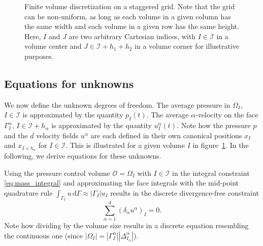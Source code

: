 \documentclass[preprint]{elsarticle}
\begin{document}
\begin{figure}
    \caption{
        Finite volume discretization on a staggered grid. Note that the grid can
        be non-uniform, as long as each volume in a given column has the same
        width and each volume in a given row has the same height. Here, $I$ and
        $J$ are two arbitrary Cartesian indices, with $I \in \mathcal{I}$ in a
        volume center and $J \in \mathcal{I} + h_1 + h_2$ in a volume corner for
        illustrative purposes.
    }
    \label{fig:finitevolumes}
\end{figure}

\subsection{Equations for unknowns}

We now define the unknown degrees of freedom. The average pressure in
$\Omega_I$, $I \in \mathcal{I}$ is approximated by the quantity $p_I(t)$. The
average $\alpha$-velocity on the face $\Gamma^\alpha_I$, $I \in \mathcal{I} +
h_\alpha$ is approximated by the quantity $u^\alpha_I(t)$. Note how the pressure
$p$ and the $d$ velocity fields $u^\alpha$ are each defined in their own
canonical positions $x_I$ and $x_{I + h_\alpha}$ for $I \in \mathcal{I}$. This
is illustrated for a given volume $I$ in figure~\ref{fig:finitevolumes}. In the
following, we derive equations for these unknowns.

Using the pressure control volume $\mathcal{O} = \Omega_I$ with $I \in
\mathcal{I}$ in the integral constraint \eqref{eq:mass_integral} and
approximating the face integrals with the mid-point quadrature rule
$\int_{\Gamma_I} u \, \mathrm{d} \Gamma \approx | \Gamma_I | u_I$ results in the
discrete divergence-free constraint
\begin{equation} \label{eq:mass_discrete}
    \sum_{\alpha = 1}^d
    (\delta_\alpha u^\alpha)_I = 0.
\end{equation}
Note how dividing by the volume size results in a discrete equation resembling
the continuous one (since $| \Omega_I | = | \Gamma^\alpha_I | |
\Delta^\alpha_{I_\alpha} |$).
\end{document}
